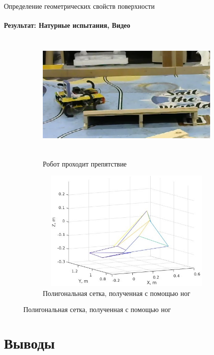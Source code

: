 \documentclass[aspectratio=169,xcolor=table,10pt]{beamer}
\begin{document}
\begin{frame}[t]{Определение геометрических свойств поверхности}
    \framesubtitle{Результат: Натурные испытания, Видео}
    \vspace{-0.5cm}
    \begin{figure}[H]
        \begin{subfigure}[t]{0.49\textwidth}
            \href{https://youtu.be/2dxHHTG4psQ}{
                \centering\includegraphics[height=6cm,width=1\textwidth,keepaspectratio]{real_robot_mesh_video_preview.png}}
            \caption*{Робот проходит препятствие}
        \end{subfigure}
        \begin{subfigure}[t]{0.49\textwidth}
            \centering\includegraphics[height=6cm,width=1\textwidth,keepaspectratio]{real_mesh.jpg}
            \caption*{Полигональная сетка, полученная с помощью ног}
        \end{subfigure}
    \end{figure}
\end{frame}

\section{Выводы}
\end{document}
